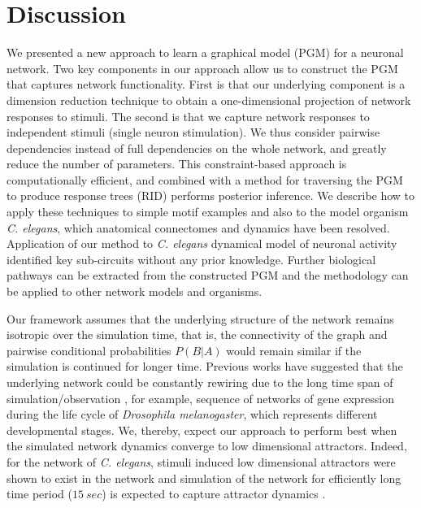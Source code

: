 \documentclass[letterpaper,11pt]{article}
\newcommand\tab[1][6mm]{\hspace*{#1}}
\begin{document}
\section{Discussion}
\tab We presented a new approach to learn a graphical model (PGM) for a neuronal network. Two key components in our approach allow us to construct the PGM that captures network functionality. First is that our underlying component is a dimension reduction technique to obtain a one-dimensional projection of network responses to stimuli. The second is that we capture network responses to independent stimuli (single neuron stimulation). We thus consider pairwise dependencies instead of full dependencies on the whole network, and greatly reduce the number of parameters. This constraint-based approach is computationally efficient, and combined with a method for traversing the PGM to produce response trees (RID) performs posterior inference. We describe how to apply these techniques to simple motif examples and also to the model organism \textit{C. elegans}, which anatomical connectomes and dynamics have been resolved. Application of our method to \textit{C. elegans} dynamical model of neuronal activity identified key sub-circuits without any prior knowledge. Further biological pathways can be extracted from the constructed PGM and the methodology can be applied to other network models and organisms. 

Our framework assumes that the underlying structure of the network remains isotropic over the simulation time, that is, the connectivity of the graph and pairwise conditional probabilities $P(B|A)$ would remain similar if the simulation is continued for longer time. Previous works have suggested that the underlying network could be constantly rewiring due to the long time span of simulation/observation \cite{varying1,varying2}, for example, sequence of networks of gene expression during the life cycle of \textit{Drosophila melanogaster}, which represents different developmental stages. We, thereby, expect our approach to perform best when the simulated network dynamics converge to low dimensional attractors. Indeed, for the network of \textit{C. elegans}, stimuli induced low dimensional attractors were shown to exist in the network and simulation of the network for efficiently long time period ($15~sec$) is expected to capture attractor dynamics \cite{dynome}.
\end{document}
